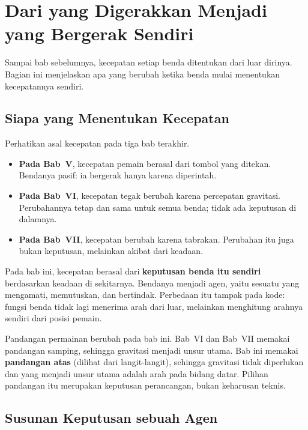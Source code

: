 \section{Dari yang Digerakkan Menjadi yang Bergerak Sendiri}
\label{sec:bergerak-sendiri}

Sampai bab sebelumnya, kecepatan setiap benda ditentukan dari luar dirinya.
Bagian ini menjelaskan apa yang berubah ketika benda mulai menentukan
kecepatannya sendiri.

\subsection{Siapa yang Menentukan Kecepatan}

Perhatikan asal kecepatan pada tiga bab terakhir.

\begin{itemize}
  \item \textbf{Pada Bab~V}, kecepatan pemain berasal dari tombol yang ditekan.
        Bendanya pasif: ia bergerak hanya karena diperintah.
  \item \textbf{Pada Bab~VI}, kecepatan tegak berubah karena percepatan
        gravitasi. Perubahannya tetap dan sama untuk semua benda; tidak ada
        keputusan di dalamnya.
  \item \textbf{Pada Bab~VII}, kecepatan berubah karena tabrakan. Perubahan itu
        juga bukan keputusan, melainkan akibat dari keadaan.
\end{itemize}

Pada bab ini, kecepatan berasal dari \textbf{keputusan benda itu sendiri}
berdasarkan keadaan di sekitarnya. Bendanya menjadi agen, yaitu sesuatu yang
mengamati, memutuskan, dan bertindak. Perbedaan itu tampak pada kode: fungsi
 benda tidak lagi menerima arah dari luar, melainkan menghitung
arahnya sendiri dari posisi pemain.

\begin{catatabox}
Pandangan permainan berubah pada bab ini. Bab~VI dan Bab~VII
memakai pandangan samping, sehingga gravitasi menjadi unsur utama. Bab ini
memakai \textbf{pandangan atas} (dilihat dari langit-langit), sehingga gravitasi
tidak diperlukan dan yang menjadi unsur utama adalah arah pada bidang datar.
Pilihan pandangan itu merupakan keputusan perancangan, bukan keharusan teknis.
\end{catatabox}

\subsection{Susunan Keputusan sebuah Agen}

